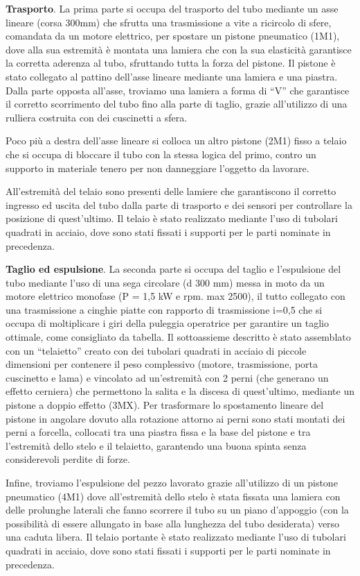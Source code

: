 \documentclass{report}
\begin{document}
\begin{description}
\item \textbf{Trasporto}. La prima parte si occupa del trasporto del tubo mediante un asse lineare (corsa 300mm) che sfrutta una trasmissione a vite a ricircolo di sfere, comandata da un motore elettrico, per spostare un pistone pneumatico (1M1), dove alla sua estremità è montata una lamiera che con la sua elasticità garantisce la corretta aderenza al tubo, sfruttando tutta la forza del pistone. Il pistone è stato collegato al pattino dell’asse lineare mediante una lamiera e una piastra. Dalla parte opposta all’asse, troviamo una lamiera a forma di “V” che garantisce il corretto scorrimento del tubo fino alla parte di taglio, grazie all’utilizzo di una rulliera costruita con dei cuscinetti a sfera. 

Poco più a destra dell’asse lineare si colloca un altro pistone (2M1) fisso a telaio che si occupa di bloccare il tubo con la stessa logica del primo, contro un supporto in materiale tenero per non danneggiare l’oggetto da lavorare. 

All’estremità del telaio sono presenti delle lamiere che garantiscono il corretto ingresso ed uscita del tubo dalla parte di trasporto e dei sensori per controllare la posizione di quest’ultimo. Il telaio è stato realizzato mediante l’uso di tubolari quadrati in acciaio, dove sono stati fissati i supporti per le parti nominate in precedenza.

\item \textbf{Taglio ed espulsione}. La seconda parte si occupa del taglio e l’espulsione del tubo mediante l’uso di una sega circolare (d 300 mm) messa in moto da un motore elettrico monofase (P = 1,5 kW e rpm. max 2500), il tutto collegato con una trasmissione a cinghie piatte con rapporto di trasmissione i=0,5 che si occupa di moltiplicare i giri della puleggia operatrice per garantire un taglio ottimale, come consigliato da tabella. Il sottoassieme descritto è stato assemblato con un “telaietto” creato con dei tubolari quadrati in acciaio di piccole dimensioni per contenere il peso complessivo (motore, trasmissione, porta cuscinetto e lama) e vincolato ad un’estremità con 2 perni (che generano un effetto cerniera) che permettono la salita e la discesa di quest’ultimo, mediante un pistone a doppio effetto (3MX). Per trasformare lo spostamento lineare del pistone in angolare dovuto alla rotazione attorno ai perni sono stati montati dei perni a forcella, collocati tra una piastra fissa e la base del pistone e tra l’estremità dello stelo e il telaietto, garantendo una buona spinta senza considerevoli perdite di forze. 

Infine, troviamo l’espulsione del pezzo lavorato grazie all’utilizzo di un pistone pneumatico (4M1) dove all’estremità dello stelo è stata fissata una lamiera con delle prolunghe laterali che fanno scorrere il tubo su un piano d’appoggio (con la possibilità di essere allungato in base alla lunghezza del tubo desiderata) verso una caduta libera. Il telaio portante è stato realizzato mediante l’uso di tubolari quadrati in acciaio, dove sono stati fissati i supporti per le parti nominate in precedenza.

\end{description}
\end{document}
